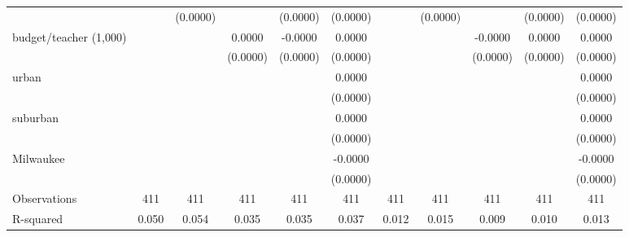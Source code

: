 {\begin{tabular}{l*{10}{c}}
                    &                     &    (0.0000)         &                     &    (0.0000)         &    (0.0000)         &                     &    (0.0000)         &                     &    (0.0000)         &    (0.0000)         \\
[1em]
budget/teacher (1,000)&                     &                     &      0.0000\sym{***}&     -0.0000         &      0.0000         &                     &                     &     -0.0000         &      0.0000         &      0.0000         \\
                    &                     &                     &    (0.0000)         &    (0.0000)         &    (0.0000)         &                     &                     &    (0.0000)         &    (0.0000)         &    (0.0000)         \\
[1em]
urban               &                     &                     &                     &                     &      0.0000         &                     &                     &                     &                     &      0.0000         \\
                    &                     &                     &                     &                     &    (0.0000)         &                     &                     &                     &                     &    (0.0000)         \\
[1em]
suburban            &                     &                     &                     &                     &      0.0000         &                     &                     &                     &                     &      0.0000         \\
                    &                     &                     &                     &                     &    (0.0000)         &                     &                     &                     &                     &    (0.0000)         \\
[1em]
Milwaukee           &                     &                     &                     &                     &     -0.0000\sym{**} &                     &                     &                     &                     &     -0.0000         \\
                    &                     &                     &                     &                     &    (0.0000)         &                     &                     &                     &                     &    (0.0000)         \\
\hline
Observations        &         411         &         411         &         411         &         411         &         411         &         411         &         411         &         411         &         411         &         411         \\
R-squared           &       0.050         &       0.054         &       0.035         &       0.035         &       0.037         &       0.012         &       0.015         &       0.009         &       0.010         &       0.013         \\
\hline\hline
\end{tabular}
}

